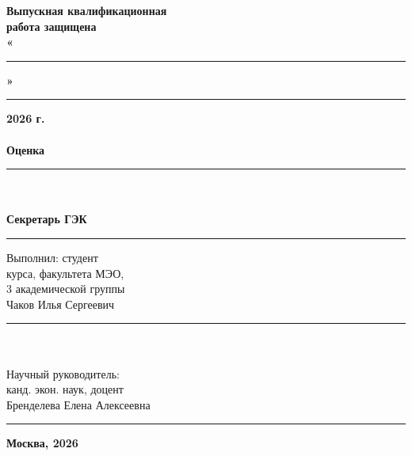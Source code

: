 \begin{minipage}[b]{0.49\textwidth}
    \textbf{Выпускная квалификационная \\
    работа защищена} \\[5pt]
    \textbf{«}\rule{0.5cm}{0.4pt}\textbf{»} \rule{3cm}{0.4pt} \textbf{2026 г.}
    \\ \\
    \textbf{Оценка} \rule{3cm}{0.4pt}
    \\ \\
    \textbf{Секретарь ГЭК} \rule{3cm}{0.4pt}
\end{minipage}
\hfil
\begin{minipage}[b]{0.49\textwidth}
    Выполнил: студент \\
    \uppercase\expandafter{} курса, факультета МЭО, \\
    3 академической группы \\
    Чаков Илья Сергеевич \\[5pt]
    \rule{3cm}{0.4pt}
    \\ \\
    Научный руководитель: \\
    канд. экон. наук, доцент \\
    Бренделева Елена Алексеевна \\[5pt]
    \rule{3cm}{0.4pt}
\end{minipage}

\vspace{0pt plus2fill} %

\begin{center}
	\textbf{Москва, 2026}
\end{center}